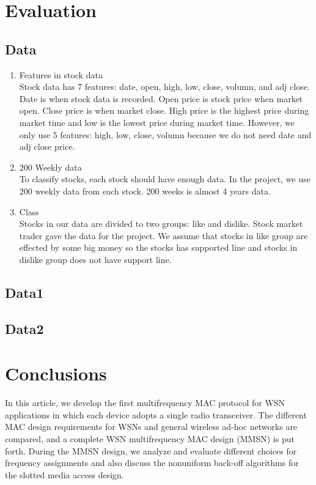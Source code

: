 \documentclass[12pt]{article}
\begin{document}
\section{Evaluation}
\subsection{Data}
\begin{enumerate}
	\item Features in stock data\\
		Stock data has 7 features: date, open, high, low, close, volumn, and adj close. Date is when stock data is recorded. Open price is stock price when market open. Close price is when market close. High price is the highest price during market time and low is the lowest price during market time. However, we only use 5 features: high, low, close, volumn because we do not need date and adj close price. 
		
	\item 200 Weekly data\\
		To classify stocks, each stock should have enough data. In the project, we use 200 weekly data from each stock. 200 weeks is almost 4 years data.
		
	\item Class\\
		Stocks in our data are divided to two groups: like and dislike. Stock market trader gave the data for the project. We assume that stocks in like group are effected by some big money so the stocks has supported line and stocks in dislike group does not have support line. 
\end{enumerate}

\subsection{Data1}

\subsection{Data2}


\section{Conclusions}
In this article, we develop the first multifrequency MAC protocol for
WSN applications in which each device adopts a
single radio transceiver. The different MAC design requirements for
WSNs and general wireless ad-hoc networks are
compared, and a complete WSN multifrequency MAC design (MMSN) is
put forth. During the MMSN design, we analyze and evaluate different
choices for frequency assignments and also discuss the nonuniform
back-off algorithms for the slotted media access design.
\end{document}

